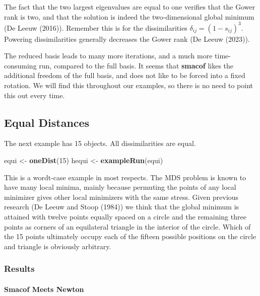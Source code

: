 \documentclass[
  12pt,
]{article}
\newenvironment{Shaded}{\begin{snugshade}}{\end{snugshade}}
\newcommand{\DecValTok}[1]{\textcolor[rgb]{0.00,0.00,0.81}{#1}}
\newcommand{\FunctionTok}[1]{\textcolor[rgb]{0.13,0.29,0.53}{\textbf{#1}}}
\newcommand{\NormalTok}[1]{#1}
\newcommand{\OtherTok}[1]{\textcolor[rgb]{0.56,0.35,0.01}{#1}}
\begin{document}
The fact that the two largest eigenvalues are equal to one verifies that the Gower rank is two, and that the solution is indeed the two-dimensional global minimum (De Leeuw (2016)). Remember this is for the dissimilarities \(\delta_{ij}=(1-s_{ij})^3\). Powering dissimilarities generally decreases the Gower rank (De Leeuw (2023)).

The reduced basis leads to many more iterations, and a much more time-consuming run, compared to the full
basis. It seems that \textbf{smacof} likes the additional freedom of the full basis, and does not like
to be forced into a fixed rotation. We will find this throughout our examples, so there is no need
to point this out every time.

\subsection{Equal Distances}\label{equal-distances}

The next example has 15 objects. All dissimilarities are equal.

\begin{Shaded}
\begin{Highlighting}[]
\NormalTok{equi }\OtherTok{\textless{}{-}} \FunctionTok{oneDist}\NormalTok{(}\DecValTok{15}\NormalTok{)}
\NormalTok{hequi }\OtherTok{\textless{}{-}} \FunctionTok{exampleRun}\NormalTok{(equi)}
\end{Highlighting}
\end{Shaded}

This is a wordt-case example in most respects. The MDS problem is known to have many local minima, mainly because permuting the points of any local minimizer gives other local minimizers with the same stress. Given previous research
(De Leeuw and Stoop (1984)) we think that the global minimum is attained with twelve points
equally spaced on a circle and the remaining three points as corners of an equilateral triangle in the interior of the circle. Which of the 15 points ultimately occupy each of the fifteen possible positions on the circle and triangle is obviously arbitrary.

\subsubsection{Results}\label{results-2}

\paragraph{Smacof Meets Newton}\label{smacof-meets-newton-2}
\end{document}
